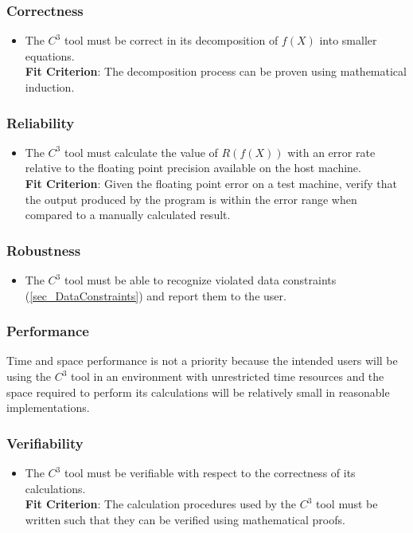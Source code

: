 \documentclass[12pt]{article}
\newcommand{\prognameAbbrv}{$C^{3}$}
\begin{document}
\subsubsection*{Correctness}
\begin{itemize}
	\item The \prognameAbbrv{} tool must be correct in its decomposition of 
	$f(X)$ into smaller equations.\\ \textbf{Fit Criterion}: The decomposition 
	process can be proven using mathematical induction.
\end{itemize}

\subsubsection*{Reliability}
\begin{itemize}
	\item The \prognameAbbrv{} tool must calculate the value of $R(f(X))$ with 
	an error rate relative to the floating point precision available on the 
	host machine. \\ \textbf{Fit Criterion}: Given the floating point error on 
	a test machine, verify that the output produced by the program is within 
	the error range when compared to a manually calculated result.
\end{itemize}

\subsubsection*{Robustness}
\begin{itemize}
	\item The \prognameAbbrv{} tool must be able to recognize violated data 
	constraints (\ref{sec_DataConstraints}) and report them to the user.
\end{itemize}

\subsubsection*{Performance}
Time and space performance is not a priority because the intended users will be 
using the \prognameAbbrv{} tool in an environment with unrestricted time 
resources and the space required to perform its calculations will be relatively 
small in reasonable implementations.

\subsubsection*{Verifiability}
\begin{itemize}
	\item The \prognameAbbrv{} tool must be verifiable with respect to the 
	correctness of its calculations.\\ \textbf{Fit Criterion}: The calculation 
	procedures used by the \prognameAbbrv{} tool must be written such that they 
	can be verified using mathematical proofs.
\end{itemize}
\end{document}
